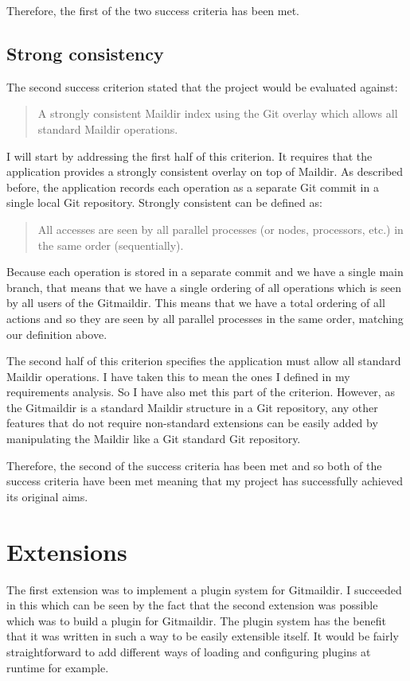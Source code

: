 Therefore, the first of the two success criteria has been met.

\subsection{Strong consistency}

The second success criterion stated that the project would be evaluated against:

\begin{quote}
  A strongly consistent Maildir index using the Git overlay which allows all standard Maildir operations.
\end{quote}

I will start by addressing the first half of this criterion. It requires that the application provides a strongly consistent overlay on top of Maildir. As described before, the application records each operation as a separate Git commit in a single local Git repository. Strongly consistent can be defined as:
\begin{quote}
  All accesses are seen by all parallel processes (or nodes, processors, etc.) in the same order (sequentially).
\end{quote}
Because each operation is stored in a separate commit and we have a single main branch, that means that we have a single ordering of all operations which is seen by all users of the Gitmaildir. This means that we have a total ordering of all actions and so they are seen by all parallel processes in the same order, matching our definition above.

The second half of this criterion specifies the application must allow all standard Maildir operations. I have taken this to mean the ones I defined in my requirements analysis. So I have also met this part of the criterion. However, as the Gitmaildir is a standard Maildir structure in a Git repository, any other features that do not require non-standard extensions can be easily added by manipulating the Maildir like a Git standard Git repository.

Therefore, the second of the success criteria has been met and so both of the success criteria have been met meaning that my project has successfully achieved its original aims.

\section{Extensions}

The first extension was to implement a plugin system for Gitmaildir. I succeeded in this which can be seen by the fact that the second extension was possible which was to build a plugin for Gitmaildir. The plugin system has the benefit that it was written in such a way to be easily extensible itself. It would be fairly straightforward to add different ways of loading and configuring plugins at runtime for example.


